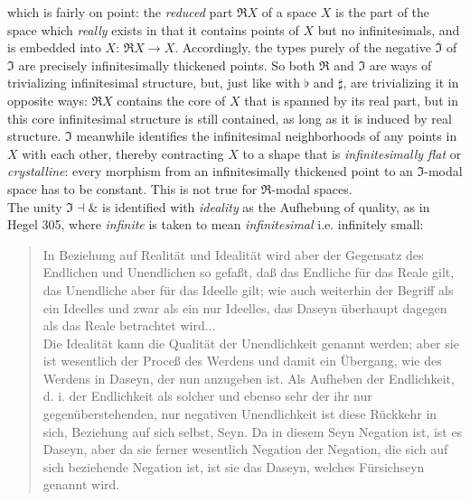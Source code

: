 \documentclass{article}
\begin{document}
which is fairly on point: the \emph{reduced} part $\Re X$ of a space $X$ is the part of the space which
\emph{really} exists in that it contains points of $X$ but no infinitesimals, and is embedded into $X$: $\Re
X\rightarrow X$. Accordingly, the types purely of the negative $\overline{\Im}$ of $\Im$ are precisely
infinitesimally thickened points. So both $\Re$ and $\Im$ are ways of trivializing infinitesimal structure,
but, just like with $\flat$ and  $\sharp$, are trivializing it in opposite ways: $\Re X$ contains the core of
$X$ that is spanned by its real part, but in this core infinitesimal structure is still contained, as long as it is induced by real structure. $\Im$ meanwhile identifies the infinitesimal neighborhoods of any points in $X$ with each other, thereby contracting $X$ to a shape that is \emph{infinitesimally flat} or \emph{crystalline}: every morphism from an infinitesimally thickened point to an $\Im$-modal space has to be constant. This is not true for $\Re$-modal spaces. \\ 

The unity $\Im\dashv\&$ is identified with \emph{ideality} as the Aufhebung of quality, as in Hegel 305,
where \emph{infinite} is taken to mean \emph{infinitesimal} i.e. infinitely small:

\begin{quote}
    In Beziehung auf Realität und Idealität wird aber der Gegensatz des Endlichen und Unendlichen so gefaßt, daß das Endliche für das Reale gilt, das Unendliche aber für das Ideelle gilt; wie auch weiterhin der Begriff als ein Ideelles und zwar als ein nur Ideelles, das Daseyn überhaupt dagegen als das Reale betrachtet wird... \\

    Die Idealität kann die Qualität der Unendlichkeit genannt werden; aber sie ist wesentlich der Proceß des Werdens und damit ein Übergang, wie des Werdens in Daseyn, der nun anzugeben ist. Als Aufheben der Endlichkeit, d. i. der Endlichkeit als solcher und ebenso sehr der ihr nur gegenüberstehenden, nur negativen Unendlichkeit ist diese Rückkehr in sich, Beziehung auf sich selbst, Seyn. Da in diesem Seyn Negation ist, ist es Daseyn, aber da sie ferner wesentlich Negation der Negation, die sich auf sich beziehende Negation ist, ist sie das Daseyn, welches Fürsichseyn genannt wird.
\end{quote}
\end{document}

